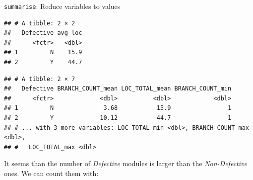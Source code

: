 \documentclass[]{book}
\newenvironment{Shaded}{\begin{snugshade}}{\end{snugshade}}
\newcommand{\KeywordTok}[1]{\textcolor[rgb]{0.13,0.29,0.53}{\textbf{{#1}}}}
\newcommand{\DataTypeTok}[1]{\textcolor[rgb]{0.13,0.29,0.53}{{#1}}}
\newcommand{\StringTok}[1]{\textcolor[rgb]{0.31,0.60,0.02}{{#1}}}
\newcommand{\CommentTok}[1]{\textcolor[rgb]{0.56,0.35,0.01}{\textit{{#1}}}}
\newcommand{\OtherTok}[1]{\textcolor[rgb]{0.56,0.35,0.01}{{#1}}}
\newcommand{\NormalTok}[1]{{#1}}
\begin{document}
\texttt{summarise}: Reduce variables to values

\begin{Shaded}
\end{Shaded}

\begin{verbatim}
## # A tibble: 2 × 2
##   Defective avg_loc
##      <fctr>   <dbl>
## 1         N    15.9
## 2         Y    44.7
\end{verbatim}

\begin{Shaded}
\end{Shaded}

\begin{verbatim}
## # A tibble: 2 × 7
##   Defective BRANCH_COUNT_mean LOC_TOTAL_mean BRANCH_COUNT_min
##      <fctr>             <dbl>          <dbl>            <dbl>
## 1         N              3.68           15.9                1
## 2         Y             10.12           44.7                1
## # ... with 3 more variables: LOC_TOTAL_min <dbl>, BRANCH_COUNT_max <dbl>,
## #   LOC_TOTAL_max <dbl>
\end{verbatim}

It seems than the number of \emph{Defective} modules is larger than the
\emph{Non-Defective} ones. We can count them with:

\begin{Shaded}
\end{Shaded}
\end{document}
